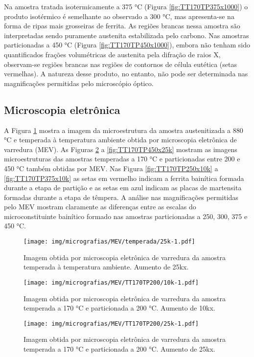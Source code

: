 Na amostra tratada isotermicamente a 375 °C (Figura \ref{fig:TT170TP375x1000}) o produto isotérmico é semelhante ao observado a 300 °C, mas apresenta-se na forma de ripas mais grosseiras de ferrita. As regiões brancas nessa amostra são interpretadas sendo puramente austenita estabilizada pelo carbono. Nas amostras particionadas a 450 °C (Figura \ref{fig:TT170TP450x1000}), embora não tenham sido quantificados frações volumétricas de austenita pela difração de raios X, observam-se regiões brancas nas regiões de contornos de célula eutética (setas vermelhas). A natureza desse produto, no entanto, não pode ser determinada nas magnificações permitidas pelo microscópio óptico.

\subsection{Microscopia eletrônica}

A Figura \ref{fig:temperadax25k} mostra a imagem da microestrutura da amostra austenitizada a 880 °C e temperada à temperatura ambiente obtida por microscopia eletrônica de varredura (MEV). As Figuras \ref{fig:TT170TP200x10k} a \ref{fig:TT170TP450x25k} mostram as imagens microestruturas das amostras temperadas a 170 °C e particionadas entre 200 e 450 °C também obtidas por MEV. Nas Figura \ref{fig:TT170TP250x10k} a \ref{fig:TT170TP375x10k} as setas em vermelho indicam a ferrita bainítica formada durante a etapa de partição e as setas em azul indicam as placas de martensita formadas durante a etapa de têmpera. A análise nas magnificações permitidas pelo MEV mostram claramente as diferenças entre as escalas do microconstituinte bainítico formado nas amostras particionadas a 250, 300, 375 e 450 °C.

\begin{figure}
	\texttt{[image: img/micrografias/MEV/temperada/25k-1.pdf]}
	\caption{Imagem obtida por microscopia eletrônica de varredura da amostra temperada à temperatura ambiente. Aumento de 25kx.}
	\label{fig:temperadax25k}
\end{figure}

\begin{figure}
	\texttt{[image: img/micrografias/MEV/TT170TP200/10k-1.pdf]}
	\caption{Imagem obtida por microscopia eletrônica de varredura da amostra temperada a 170 °C e particionada a 200 °C. Aumento de 10kx.}
	\label{fig:TT170TP200x10k}
\end{figure}

\begin{figure}
	\texttt{[image: img/micrografias/MEV/TT170TP200/25k-1.pdf]}
	\caption{Imagem obtida por microscopia eletrônica de varredura da amostra temperada a 170 °C e particionada a 200 °C. Aumento de 25kx.}
	\label{fig:TT170TP200x25k}
\end{figure}

